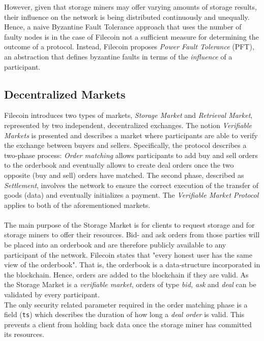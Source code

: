 \documentclass[conference]{IEEEtran}
\begin{document}
However, given that storage miners may offer varying amounts of storage results, their influence on the network is being distributed continuously and unequally.
Hence, a naive Byzantine Fault Tolerance approach that uses the number of faulty nodes is in the case of Filecoin not a sufficient measure for determining the outcome of a protocol.
Instead, Filecoin proposes \textit{Power Fault Tolerance} (PFT)\cite{filecoin-pft}, an abstraction that defines byzantine faults in terms of the \textit{influence} of a participant.


\subsection{Decentralized Markets}
\label{subsec:markets}
Filecoin introduces two types of markets, \textit{Storage Market} and \textit{Retrieval Market}, represented by two independent, decentralized exchanges.
The notion \textit{Verifiable Markets} is presented and describes a market where participants are able to verify the exchange between buyers and sellers.
Specifically, the protocol describes a two-phase process: \textit{Order matching} allows participants to add buy and sell orders to the orderbook and eventually allows to create deal orders once the two opposite (buy and sell) orders have matched.
The second phase, described as \textit{Settlement}, involves the network to ensure the correct execution of the transfer of goods (data) and eventually initializes a payment.
The \textit{Verifiable Market Protocol} applies to both of the aforementioned markets.\cite{filecoin}
\\
\\
The main purpose of the Storage Market is for clients to request storage and for storage miners to offer their resources. 
Bid- and ask orders from those parties will be placed into an orderbook and are therefore publicly available to any participant of the network.
Filecoin states that "every honest user has the same view of the orderbook".
That is, the orderbook is a data-structure incorporated in the blockchain.
Hence, orders are added to the blockchain if they are valid.
As the Storage Market is a \textit{verifiable market}, orders of type \textit{bid, ask} and \textit{deal} can be validated by every participant.
\\
\indent
The only security related parameter required in the order matching phase is a field (\texttt{ts}) which describes the duration of how long a \textit{deal order} is valid.
This prevents a client from holding back data once the storage miner has committed its resources.
\end{document}
